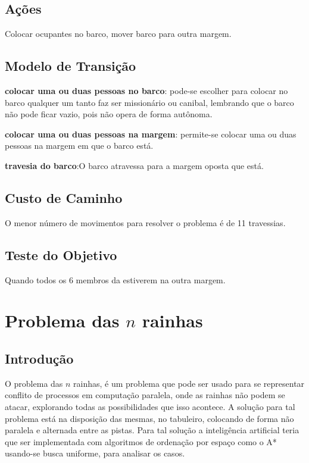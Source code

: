 \documentclass[12pt,a4paper,twocolumn]{article}
\begin{document}
\subsection{Ações}
Colocar ocupantes no barco, mover barco para outra margem.


\subsection{Modelo de Transição}
 \textbf{colocar uma ou duas pessoas no barco}: pode-se escolher para colocar no barco qualquer um tanto faz ser missionário ou canibal, lembrando que o barco não pode ficar vazio, pois não opera de forma autônoma.



\textbf{colocar uma ou duas pessoas na margem}: permite-se colocar uma ou duas pessoas na margem em que o barco está.


\textbf{travesia do barco}:O barco atravessa para a margem oposta que está.

\subsection{Custo de Caminho}
O menor número de movimentos para resolver o problema é de 11 travessias.

\subsection{Teste do Objetivo}
 Quando todos os 6 membros da estiverem na outra margem.




\section{Problema das $n$ rainhas}
\subsection{Introdução}
O problema das $n$ rainhas, é um problema que pode ser usado para se representar conflito de processos em computação paralela, onde as rainhas não podem se atacar, explorando todas as possibilidades que isso acontece. 	A solução para tal problema está na disposição das mesmas, no tabuleiro, colocando de forma não paralela e alternada entre as pistas. Para tal solução a inteligência artificial teria que ser implementada com algoritmos de ordenação por espaço como o A* usando-se busca uniforme, para analisar os casos.
\end{document}
